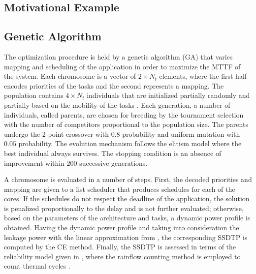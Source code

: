\subsection{Motivational Example} \label{sec:motivation}


\subsection{Genetic Algorithm}
The optimization procedure is held by a genetic algorithm (GA) \cite{schmitz2004} that varies mapping and scheduling of the application in order to maximize the MTTF of the system. Each chromosome is a vector of $2 \times N_t$ elements, where the first half encodes priorities of the tasks and the second represents a mapping. The population contains $4 \times N_t$ individuals that are initialized partially randomly and partially based on the mobility of the tasks \cite{schmitz2004}. Each generation, a number of individuals, called parents, are chosen for breeding by the tournament selection with the number of competitors proportional to the population size. The parents undergo the 2-point crossover with $0.8$ probability and uniform mutation with $0.05$ probability. The evolution mechanism follows the elitism model where the best individual always survives. The stopping condition is an absence of improvement within $200$ successive generations.

A chromosome is evaluated in a number of steps. First, the decoded priorities and mapping are given to a list scheduler that produces schedules for each of the cores. If the schedules do not respect the deadline of the application, the solution is penalized proportionally to the delay and is not further evaluated; otherwise, based on the parameters of the architecture and tasks, a dynamic power profile is obtained. Having the dynamic power profile and taking into consideration the leakage power with the linear approximation from , the corresponding SSDTP is computed by the CE method. Finally, the SSDTP is assessed in terms of the reliability model given in , where the rainflow counting method is employed to count thermal cycles \cite{xiang2010}.
